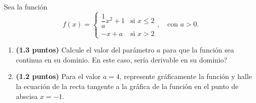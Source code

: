 
Sea la función
\[
f(x)=\begin{cases}
\dfrac{1}{a}x^2+1 & \text{si }x\leq 2\\[4pt]
-x+a & \text{si }x>2
\end{cases},\quad\text{con }a>0.
\]
\begin{enumerate}[label=\alph*)]
\item \textbf{(1.3 puntos)} Calcule el valor del parámetro $a$ para que la función sea continua en su dominio. En este caso, \textquestiondown{}sería derivable en su dominio?
\item \textbf{(1.2 puntos)} Para el valor $a=4$, represente gráficamente la función y halle la ecuación de la recta tangente a la gráfica de la función en el punto de abscisa $x=-1$.
\end{enumerate}
